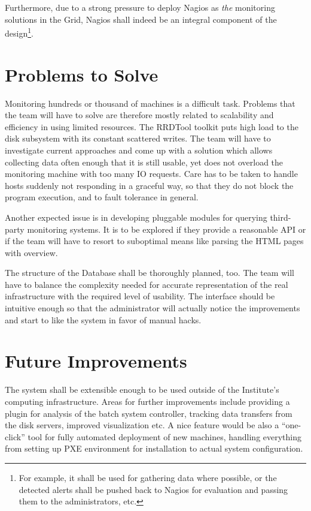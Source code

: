 \documentclass{article}
\begin{document}
Furthermore, due to a strong pressure to deploy Nagios as {\em the} monitoring solutions in the Grid, Nagios shall indeed be an
integral component of the design\footnote{For example, it shall be used for gathering data where possible, or the detected alerts
shall be pushed back to Nagios for evaluation and passing them to the administrators, etc.}.

\section{Problems to Solve}

Monitoring hundreds or thousand of machines is a difficult task.  Problems that the team will have to solve are therefore mostly
related to scalability and efficiency in using limited resources.  The RRDTool toolkit puts high load to the disk subsystem with
its constant scattered writes.  The team will have to investigate current approaches and come up with a solution which allows
collecting data often enough that it is still usable, yet does not overload the monitoring machine with too many IO requests.
Care has to be taken to handle hosts suddenly not responding in a graceful way, so that they do not block the program execution,
and to fault tolerance in general.

Another expected issue is in developing pluggable modules for querying third-party monitoring systems.  It is to be explored if
they provide a reasonable API or if the team will have to resort to suboptimal means like parsing the HTML pages with overview.

The structure of the Database shall be thoroughly planned, too.  The team will have to balance the complexity needed for accurate
representation of the real infrastructure with the required level of usability.  The interface should be intuitive enough so that
the administrator will actually notice the improvements and start to like the system in favor of manual hacks.

\section{Future Improvements}

The system shall be extensible enough to be used outside of the Institute's computing infrastructure.  Areas for further
improvements include providing a plugin for analysis of the batch system controller, tracking data transfers from the disk
servers, improved visualization etc.  A nice feature would be also a ``one-click'' tool for fully automated deployment of new
machines, handling everything from setting up PXE environment for installation to actual system configuration.
\end{document}
